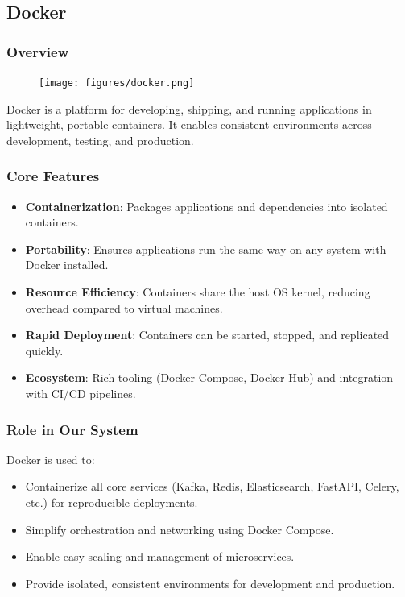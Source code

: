 \subsection{Docker}

\subsubsection{Overview}

\begin{figure}
    \vspace{-10pt}
    \texttt{[image: figures/docker.png]}
    \vspace{-10pt}
\end{figure}

Docker is a platform for developing, shipping, and running applications in lightweight, portable containers. It enables consistent environments across development, testing, and production.

\subsubsection{Core Features}
\begin{itemize}
    \item \textbf{Containerization}: Packages applications and dependencies into isolated containers.
    \item \textbf{Portability}: Ensures applications run the same way on any system with Docker installed.
    \item \textbf{Resource Efficiency}: Containers share the host OS kernel, reducing overhead compared to virtual machines.
    \item \textbf{Rapid Deployment}: Containers can be started, stopped, and replicated quickly.
    \item \textbf{Ecosystem}: Rich tooling (Docker Compose, Docker Hub) and integration with CI/CD pipelines.
\end{itemize}

\subsubsection{Role in Our System}
Docker is used to:
\begin{itemize}
    \item Containerize all core services (Kafka, Redis, Elasticsearch, FastAPI, Celery, etc.) for reproducible deployments.
    \item Simplify orchestration and networking using Docker Compose.
    \item Enable easy scaling and management of microservices.
    \item Provide isolated, consistent environments for development and production.
\end{itemize}

